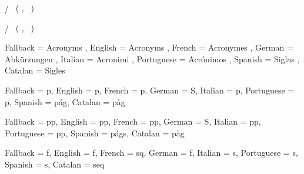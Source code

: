   {
    \acroheading
    \acropreamble
    \acronopagerange
    \let\l@acro\l@figure
    \acronymsmapF
      {
          {
            \numberline
              {   { / }  }
              {
                 {~(}
                 {,~}
                 {)}
              }
          }
          { \acropages {} {} }
          {}
      }
      { \AcroRerun }
  }

  {
    \acroheading
    \acropreamble
    \acronopagerange
    \acronymsmapF
      {
          {   { / }  }
          {}{}
          {
             {~(}
             {,~}
             {)}
          }
          { \acropages {} {} }
          {}
      }
      { \AcroRerun }
  }

  {
    Fallback   = Acronyms ,
    English    = Acronyms ,
    French     = Acronymes ,
    German     = Abk\"urzungen ,
    Italian    = Acronimi ,
    Portuguese = Acr\'onimos ,
    Spanish    = Siglas ,
    Catalan    = Sigles
  }

  {
    Fallback   = p\abbrdot ,
    English    = p\abbrdot ,
    French     = p\abbrdot ,
    German     = S\abbrdot ,
    Italian    = p\abbrdot ,
    Portuguese = p\abbrdot ,
    Spanish    = p\'ag\abbrdot ,
    Catalan    = p\`ag\abbrdot
  }

  {
    Fallback   = pp\abbrdot ,
    English    = pp\abbrdot ,
    French     = pp\abbrdot ,
    German     = S\abbrdot ,
    Italian    = pp\abbrdot ,
    Portuguese = pp\abbrdot ,
    Spanish    = p\'ags\abbrdot ,
    Catalan    = p\`ag\abbrdot
  }

  {
    Fallback   = f\abbrdot ,
    English    = f\abbrdot ,
    French     = sq\abbrdot ,
    German     = f\abbrdot ,
    Italian    = s\abbrdot ,
    Portuguese = s\abbrdot ,
    Spanish    = s\abbrdot ,
    Catalan    = seq\abbrdot
  }

